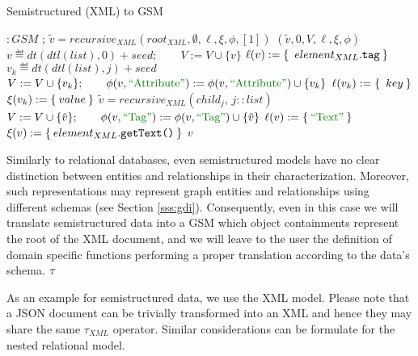 \begin{algorithm}[!t]
	\caption{Semistructured (XML) to GSM}\label{alg:xmltonested}
	{
		\begin{minipage}{\linewidth}
			\begin{algorithmic}[1]
				 $\colon GSM$ 
				;
				\State $\tilde{v} = recursive_{XML}(root_{XML},\emptyset,\ell,\xi,\phi,[1])$
				\State \Return $(\tilde{v},0,V,\ell,\xi,\phi)$
				\EndFunction
				\State
				\State $v\eqdef dt(dtl(list), 0)+seed;\qquad V:=V\cup \{v\}$
					\State $\ell(v):=\Set{\;element_{XML}.\texttt{tag}}$
						\State $v_k\eqdef dt(dtl(list),j)+seed$
						\State $V:=V\cup \{v_k\};\qquad \phi(v,\ATTR):=\phi(v,\ATTR)\cup\{v_k\}$
						\State $\ell(v_k):=\Set{\;key}$
						\State $\xi(v_k):=\Set{value}$
					\EndFor
						\State $\tilde{v}= recursive_{XML}(child_j,\,j:: list)$
						\State $V:=V\cup\{\tilde{v}\};\qquad \phi(v,\mstr{Tag}):=\phi(v,\mstr{Tag})\cup\{\tilde{v}\}$
					\EndFor
				\Else
					\State $\ell(v):=\Set{\mstr{Text}}$
					\State $\xi(v):=\Set{element_{XML}.\texttt{getText()}}$
				\EndIf
				\State \Return $v$
				\EndProcedure
			\end{algorithmic}
	\end{minipage}}
\end{algorithm}
Similarly to relational databases, even semistructured models have no clear distinction between entities and relationships in their characterization. Moreover, such representations may represent graph entities and relationships using different schemas (see Section \vref{sss:gdi}). Consequently, even in this case we will translate semistructured data into a GSM which object containments represent the root of the XML document, and we will leave to the user the definition of domain specific functions performing a proper translation according to the data's schema. $\ttranslIndex{XML to GSM}$

As an example for semistructured data, we use the XML model. Please note that a JSON document can be trivially transformed into an XML and hence they may share the same $\tau_{XML}$ operator.  Similar considerations can be formulate for the nested relational model.

